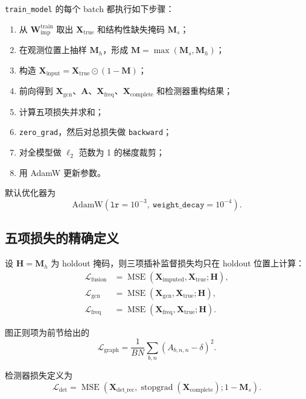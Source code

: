 \documentclass[UTF8]{ctexart}
\begin{document}
\texttt{train\_model} 的每个 batch 都执行如下步骤：
\begin{enumerate}
    \item 从 \(\bm{W}^{\text{train}}_{\text{imp}}\) 取出 \(\bm{X}_{\text{true}}\) 和结构性缺失掩码 \(\bm{M}_{s}\)；
    \item 在观测位置上抽样 \(\bm{M}_{h}\)，形成 \(\bm{M}=\max(\bm{M}_{s},\bm{M}_{h})\)；
    \item 构造 \(\bm{X}_{\text{input}}=\bm{X}_{\text{true}}\odot(1-\bm{M})\)；
    \item 前向得到 \(\bm{X}_{\text{gcn}}\)、\(\bm{A}\)、\(\bm{X}_{\text{freq}}\)、\(\bm{X}_{\text{complete}}\) 和检测器重构结果；
    \item 计算五项损失并求和；
    \item \texttt{zero\_grad}，然后对总损失做 \texttt{backward}；
    \item 对全模型做 \(\ell_2\) 范数为 1 的梯度裁剪；
    \item 用 AdamW 更新参数。
\end{enumerate}

默认优化器为
\begin{equation}
    \text{AdamW}(\texttt{lr}=10^{-3},\ \texttt{weight\_decay}=10^{-4}).
\end{equation}

\subsection{五项损失的精确定义}

设 \(\bm{H}=\bm{M}_{h}\) 为 holdout 掩码，则三项插补监督损失均只在 holdout 位置上计算：
\begin{align}
    \mathcal{L}_{\text{fusion}}
    &= \operatorname{MSE}(\bm{X}_{\text{imputed}},\bm{X}_{\text{true}};\bm{H}), \\
    \mathcal{L}_{\text{gcn}}
    &= \operatorname{MSE}(\bm{X}_{\text{gcn}},\bm{X}_{\text{true}};\bm{H}), \\
    \mathcal{L}_{\text{freq}}
    &= \operatorname{MSE}(\bm{X}_{\text{freq}},\bm{X}_{\text{true}};\bm{H}).
\end{align}

图正则项为前节给出的
\begin{equation}
    \mathcal{L}_{\text{graph}} =
    \frac{1}{BN}\sum_{b,n}\left(A_{b,n,n}-\delta\right)^2.
\end{equation}

检测器损失定义为
\begin{equation}
    \mathcal{L}_{\text{det}}
    =
    \operatorname{MSE}
    \left(
        \bm{X}_{\text{det\_rec}},
        \operatorname{stopgrad}(\bm{X}_{\text{complete}});
        1-\bm{M}_{s}
    \right).
\end{equation}
\end{document}
